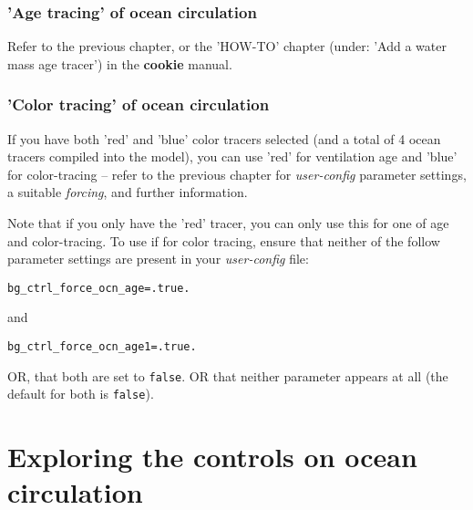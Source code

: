 \subsubsection{'Age tracing' of ocean circulation}

Refer to the previous chapter, or the 'HOW-TO' chapter (under: 'Add a water mass age tracer') in the \textbf{cookie} manual.


\subsubsection{'Color tracing' of ocean circulation}

If you have both 'red' and 'blue' color tracers selected (and a total of 4 ocean tracers compiled into the model), you can use 'red' for ventilation age and 'blue' for color-tracing -- refer to the previous chapter for \textit{user-config} parameter settings, a suitable \textit{forcing}, and further information.

Note that if you only have the 'red' tracer, you can only use this for one of age and color-tracing. To use if for color tracing, ensure that neither of the follow parameter settings are present in your \textit{user-config} file:

\small\vspace{-2pt}\begin{verbatim}
bg_ctrl_force_ocn_age=.true.
\end{verbatim}\vspace{-2pt}\normalsize

and

\small\vspace{-2pt}\begin{verbatim}
bg_ctrl_force_ocn_age1=.true.
\end{verbatim}\vspace{-2pt}\normalsize

OR, that both are set to \texttt{false}. OR that neither parameter appears at all (the default for both is \texttt{\small false}).

\newpage
%
\section{Exploring the controls on ocean circulation}

